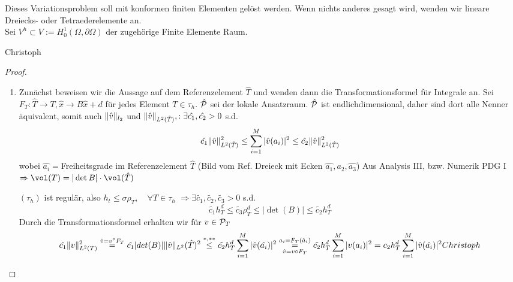 Dieses Variationsproblem soll mit konformen finiten Elementen gelöst werden. Wenn nichts anderes gesagt wird, wenden wir lineare Dreiecks- oder Tetraederelemente an. \\
Sei $V^h\subset V := H_0^1(\Omega,\partial\Omega)$ der zugehörige Finite Elemente Raum. 

Christoph

\begin{proof}
  \begin{enumerate}
    \item Zunächst beweisen wir die Aussage auf dem Referenzelement $\hat{T}$ und wenden dann die Transformationsformel für Integrale an.
      Sei $F_T: \hat{T} \to T, \hat{x}\to B\hat{x}+d$ für jedes Element $T\in \tau_h$. $\hat{\mathcal{P}}$ sei der lokale Ansatzraum. $\hat{\mathcal{P}}$ ist endlichdimensional, daher sind dort alle Nenner äquivalent, somit auch $\|\hat{v}\|_{l_2}$ und $\|\hat{v}\|_{L^2(\hat{T})}, : \exists \hat{c_1}, \hat{c_2} > 0$ s.d.
      \begin{equation} %
        \hat{c_1} \norm{\hat{v}}^2_{L^2(\hat{T})} \leq \sum_{i=1}^{M} |\hat{v}(a_i)|^2 \leq \hat{c_2} \norm{\hat{v}}^2_{L^2(\hat{T})}
        \label{}
      \end{equation}
      wobei $\hat{a_i} = $Freiheitsgrade im Referenzelement $\hat{T}$ (Bild vom Ref. Dreieck mit Ecken $\hat{a_1},\hat{a_2},\hat{a_3}$)
      Aus Analysis III, bzw. Numerik PDG I $\Rightarrow \vol(T) = |\det B| \cdot \vol(\hat{T})$

      $(\tau_h)$ ist regulär, also $h_t \leq \sigma \rho_T, \quad \forall T\in \tau_h$
      $\Rightarrow \exists \tilde{c_1}, \tilde{c_2}, \tilde{c_3} >0 $ s.d. 
      \[
        \tilde{c_1} h_T^d \leq \tilde{c_3} \rho_T^d \leq |\det(B)| \leq \tilde{c_2} h_T^d \tag{$\star$}
      \]
        \label{ }
      Durch die Transformationsformel erhalten wir für $v \in \mathcal{P}_T$
      \begin{align}
        \hat{c_1} \|v\|_{L^2(T)}^2 \overset{\hat{v}=v^\circ F_T}{=} \hat{c_1} |det (B)| \|\hat{v}\|_{L^2}(\hat{T})^2 
        \overset{*,**}{\leq} \tilde{c_2} h_T^d \sum_{i=1}^{M} |\hat{v}(\hat{a_i})|^2
        \overset{a_i = F_T(\hat{a}_i)}{\underset{\hat{v}=v \circ F_T}{=}} \tilde{c_2} h_T^d \sum_{i=1}^{M}|v(a_i)|^2 = c_2 h_T^d \sum_{i=1}^{M} |\hat{v}(\hat{a_i})|^2
      Christoph
    \end{align}
  \end{enumerate}
\end{proof}
